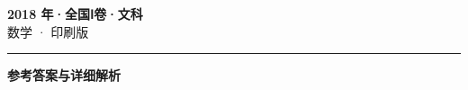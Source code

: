 \documentclass[zihao=5, a4paper]{ctexart}
\begin{document}
\begin{center}
  {\Large\bfseries 2018 年·全国Ⅰ卷·文科}\\[4pt]
  {\large 数学 · 印刷版}
\end{center}
\medskip
{}

\par\bigskip\hrule\bigskip
{}
\begin{center}{\large\bfseries 参考答案与详细解析}\end{center}
\smallskip

\end{document}
